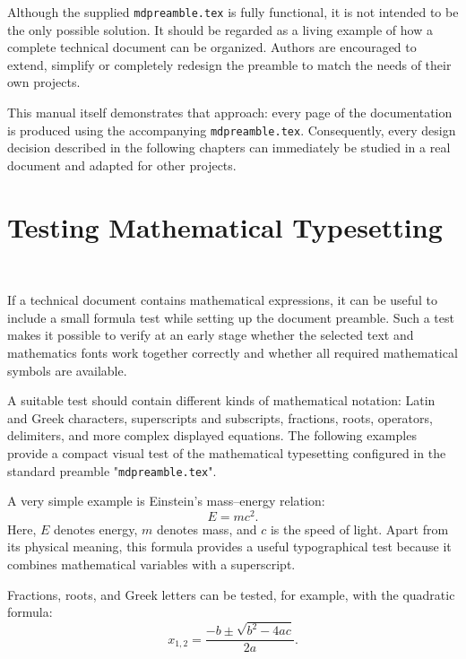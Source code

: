 \documentclass[
11pt,
a4paper,
oneside
]{scrbook}
\begin{document}
Although the supplied \texttt{mdpreamble.tex} is fully functional, it is
not intended to be the only possible solution. It should be regarded as a
living example of how a complete technical document can be organized.
Authors are encouraged to extend, simplify or completely redesign the
preamble to match the needs of their own projects.

This manual itself demonstrates that approach: every page of the
documentation is produced using the accompanying
\texttt{mdpreamble.tex}. Consequently, every design decision described in
the following chapters can immediately be studied in a real document and
adapted for other projects.
 
\section{Testing Mathematical Typesetting}
\label{sec:FormulaTest}
\begin{center}
	\\ 
\end{center}
If a technical document contains mathematical expressions, it can be useful to include a small formula test while setting up the document preamble. Such a test makes it possible to verify at an early stage whether the selected text and mathematics fonts work together correctly and whether all required mathematical symbols are available.

A suitable test should contain different kinds of mathematical notation: Latin and Greek characters, superscripts and subscripts, fractions, roots, operators, delimiters, and more complex displayed equations. The following examples provide a compact visual test of the mathematical typesetting configured in the standard \mdlayout{} preamble "\texttt{mdpreamble.tex}".

A very simple example is Einstein's mass--energy relation:
\begin{equation}
	E = mc^2 .
	\label{eq:mass-energy}
\end{equation}
Here, $E$ denotes energy, $m$ denotes mass, and $c$ is the speed of light. Apart from its physical meaning, this formula provides a useful typographical test because it combines mathematical variables with a superscript.

Fractions, roots, and Greek letters can be tested, for example, with the quadratic formula:
\begin{equation}
	x_{1,2}
	=
	\frac{-b \pm \sqrt{b^2-4ac}}{2a}.
	\label{eq:quadratic-formula}
\end{equation}
\end{document}
